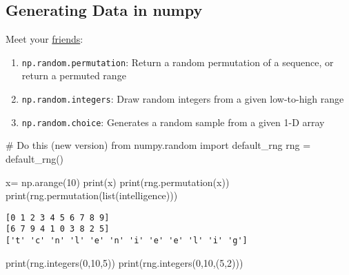 \documentclass[
  letterpaper,
  DIV=11,
  numbers=noendperiod]{scrreprt}
\newenvironment{Shaded}{\begin{snugshade}}{\end{snugshade}}
\newcommand{\BuiltInTok}[1]{\textcolor[rgb]{0.00,0.23,0.31}{#1}}
\newcommand{\CommentTok}[1]{\textcolor[rgb]{0.37,0.37,0.37}{#1}}
\newcommand{\DecValTok}[1]{\textcolor[rgb]{0.68,0.00,0.00}{#1}}
\newcommand{\ImportTok}[1]{\textcolor[rgb]{0.00,0.46,0.62}{#1}}
\newcommand{\NormalTok}[1]{\textcolor[rgb]{0.00,0.23,0.31}{#1}}
\newcommand{\OperatorTok}[1]{\textcolor[rgb]{0.37,0.37,0.37}{#1}}
\newcommand{\StringTok}[1]{\textcolor[rgb]{0.13,0.47,0.30}{#1}}
\providecommand{\tightlist}{%
  \setlength{\itemsep}{0pt}\setlength{\parskip}{0pt}}\usepackage{longtable,booktabs,array}
\begin{document}
\hypertarget{generating-data-in-numpy}{%
\subsection{Generating Data in numpy}\label{generating-data-in-numpy}}

Meet your
\href{https://numpy.org/doc/stable/reference/random/index.html}{friends}:

\begin{enumerate}
\def\labelenumi{\arabic{enumi}.}
\tightlist
\item
  \texttt{np.random.permutation}: Return a random permutation of a
  sequence, or return a permuted range
\item
  \texttt{np.random.integers}: Draw random integers from a given
  low-to-high range
\item
  \texttt{np.random.choice}: Generates a random sample from a given 1-D
  array
\end{enumerate}

\begin{Shaded}
\begin{Highlighting}[]
\CommentTok{\# Do this (new version)}
\ImportTok{from}\NormalTok{ numpy.random }\ImportTok{import}\NormalTok{ default\_rng}
\NormalTok{rng }\OperatorTok{=}\NormalTok{ default\_rng()}

\NormalTok{x}\OperatorTok{=}\NormalTok{ np.arange(}\DecValTok{10}\NormalTok{)}
\BuiltInTok{print}\NormalTok{(x)}
\BuiltInTok{print}\NormalTok{(rng.permutation(x))}
\BuiltInTok{print}\NormalTok{(rng.permutation(}\BuiltInTok{list}\NormalTok{(}\StringTok{\textquotesingle{}intelligence\textquotesingle{}}\NormalTok{)))}
\end{Highlighting}
\end{Shaded}

\begin{verbatim}
[0 1 2 3 4 5 6 7 8 9]
[6 7 9 4 1 0 3 8 2 5]
['t' 'c' 'n' 'l' 'e' 'n' 'i' 'e' 'e' 'l' 'i' 'g']
\end{verbatim}

\begin{Shaded}
\begin{Highlighting}[]
\BuiltInTok{print}\NormalTok{(rng.integers(}\DecValTok{0}\NormalTok{,}\DecValTok{10}\NormalTok{,}\DecValTok{5}\NormalTok{))}
\BuiltInTok{print}\NormalTok{(rng.integers(}\DecValTok{0}\NormalTok{,}\DecValTok{10}\NormalTok{,(}\DecValTok{5}\NormalTok{,}\DecValTok{2}\NormalTok{)))}
\end{Highlighting}
\end{Shaded}
\end{document}
